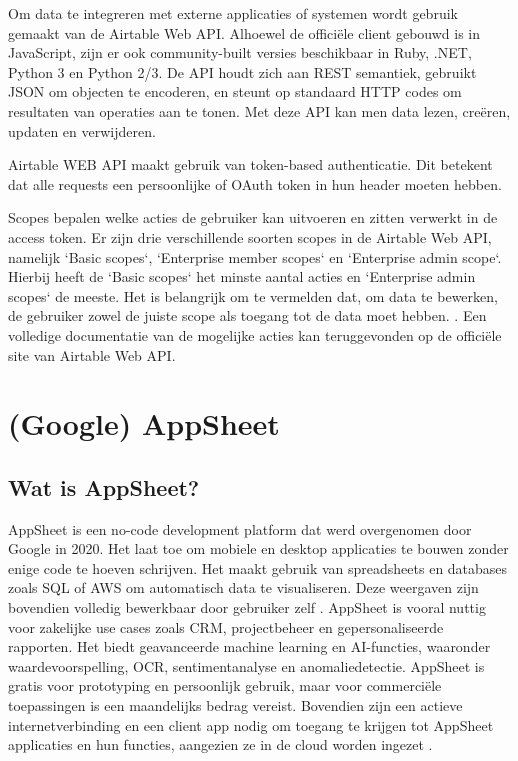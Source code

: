 
Om data te integreren met externe applicaties of systemen wordt gebruik gemaakt van de Airtable Web API. Alhoewel de officiële client gebouwd is in JavaScript, zijn er ook community-built versies beschikbaar in Ruby, .NET, Python 3 en Python 2/3. De API houdt zich aan REST semantiek, gebruikt JSON om objecten te encoderen, en steunt op standaard HTTP codes om resultaten van operaties aan te tonen. \autocite{AirtableAPI} Met deze API kan men data lezen, creëren, updaten en verwijderen.

Airtable WEB API maakt gebruik van token-based authenticatie. Dit betekent dat alle requests een persoonlijke of OAuth token in hun header moeten hebben. 
\autocite{AirtableAPIAuthentication}


Scopes bepalen welke acties de gebruiker kan uitvoeren en zitten verwerkt in de access token. Er zijn drie verschillende soorten scopes in de Airtable Web API, namelijk `Basic scopes`, `Enterprise member scopes` en `Enterprise admin scope`. Hierbij heeft de `Basic scopes` het minste aantal acties en `Enterprise admin scopes` de meeste. Het is belangrijk om te vermelden dat, om data te bewerken, de gebruiker zowel de juiste scope als toegang tot de data moet hebben. \autocite{AirtableAPIScopes}. Een volledige documentatie van de mogelijke acties kan teruggevonden op de officiële site van Airtable Web API.

\section{(Google) AppSheet}



\subsection{Wat is AppSheet?}
AppSheet is een no-code development platform dat werd overgenomen door Google in 2020. Het laat toe om mobiele en desktop applicaties te bouwen zonder enige code te hoeven schrijven. Het maakt gebruik van spreadsheets en databases zoals SQL of AWS om automatisch data te visualiseren. Deze weergaven zijn bovendien volledig bewerkbaar door gebruiker zelf \autocite{AppSheet2020}. AppSheet is vooral nuttig voor zakelijke use cases zoals CRM, projectbeheer en gepersonaliseerde rapporten. Het biedt geavanceerde machine learning en AI-functies, waaronder waardevoorspelling, OCR, sentimentanalyse en anomaliedetectie. AppSheet is gratis voor prototyping en persoonlijk gebruik, maar voor commerciële toepassingen is een maandelijks bedrag vereist. Bovendien zijn een actieve internetverbinding en een client app nodig om toegang te krijgen tot AppSheet applicaties en hun functies, aangezien ze in de cloud worden ingezet \autocite{Petrovic2020}.


